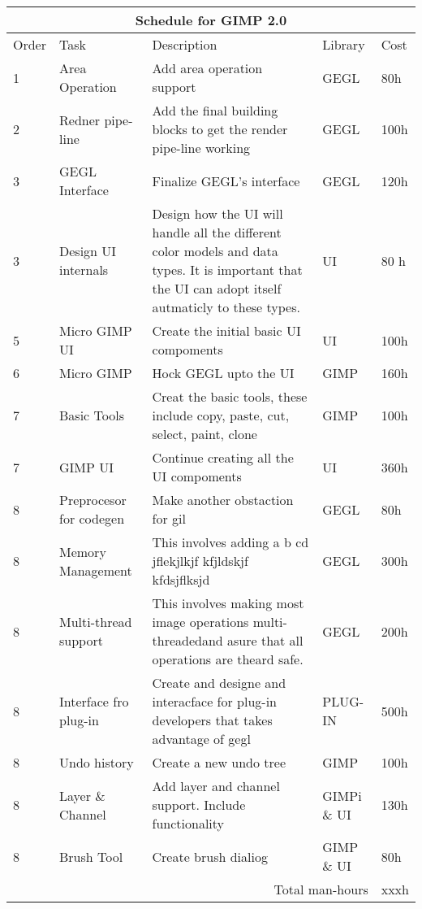
\begin{flushleft}		
\begin{tabular}{|l|p{3cm}|p{5cm}|l|l|}\hline
\multicolumn{5}{|c|}{\rule[-3mm]{0mm}{8mm} \large \bf Schedule for GIMP 2.0}\\  
\hline
Order & Task & Description & Library & Cost\\ \hline 

1 & Area Operation & Add area operation support & GEGL & 80h\\
\hline
2 & Redner pipe-line & Add the final building blocks to get the render pipe-line working & GEGL & 100h\\
\hline
3 & GEGL Interface & Finalize GEGL's interface & GEGL & 120h\\
\hline 
3 & Design UI internals & Design how the UI will handle all the different color models and data types. It is important that the UI can adopt itself autmaticly to these types. & UI & 80 h\\
\hline
5 & Micro GIMP UI & Create the initial basic UI compoments & UI & 100h\\  
\hline 
6 & Micro GIMP & Hock GEGL upto the UI & GIMP & 160h\\
\hline
7 & Basic Tools & Creat the basic tools, these include copy, paste, cut, select, paint, clone & GIMP & 100h\\
\hline
7 & GIMP UI & Continue creating all the UI compoments & UI & 360h\\
\hline
8 & Preprocesor for codegen & Make another obstaction for gil & GEGL & 80h\\
\hline
8 & Memory Management & This involves adding a b cd jflekjlkjf kfjldskjf kfdsjflksjd & GEGL & 300h\\
\hline
8 & Multi-thread support & This involves making most image operations multi-threadedand  asure that all operations are theard safe. & GEGL & 200h\\  
\hline
8 & Interface fro plug-in & Create and designe and interacface for plug-in developers that takes advantage of gegl & PLUG-IN & 500h\\
\hline
8 & Undo history & Create a new undo tree & GIMP & 100h\\
\hline
 
8 & Layer \& Channel & Add layer and channel support. Include functionality & GIMPi \& UI & 130h \\
\hline
8 & Brush Tool & Create brush dialiog & GIMP \& UI & 80h\\
\hline 
\multicolumn{4}{|r|}{Total man-hours} & xxxh\\
\hline
\end{tabular}
\end{flushleft}

	
